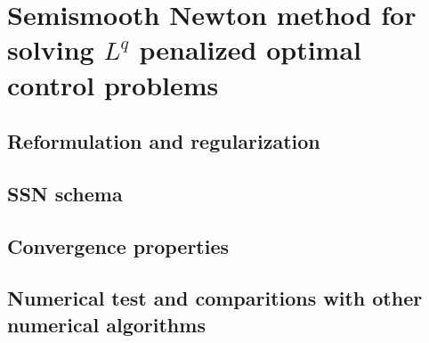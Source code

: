\chapter{Semismooth Newton method for solving $L^q$ penalized optimal control problems}
\section{Reformulation and regularization}
\section{SSN schema}
\section{Convergence properties}
\section{Numerical test and comparitions with other numerical algorithms}

